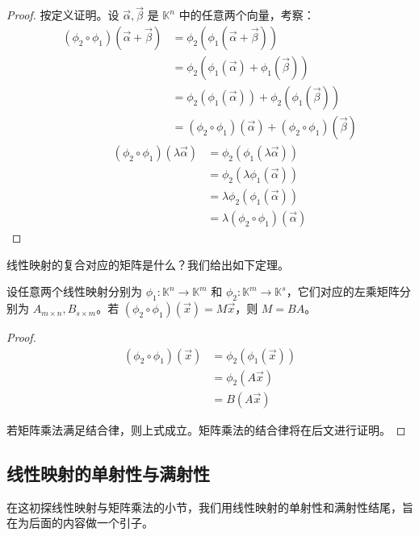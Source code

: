 \begin{proof}
	按定义证明。设 $\vec \alpha, \vec \beta$ 是 $\mathbb K^n$ 中的任意两个向量，考察：
	$$
	\begin{aligned}
		(\phi_2 \circ \phi_1) (\vec \alpha + \vec \beta) &= \phi_2(\phi_1(\vec \alpha + \vec \beta))
		\\&=
		\phi_2(\phi_1(\vec \alpha) + \phi_1(\vec \beta))
		\\&=
		\phi_2(\phi_1(\vec \alpha)) + \phi_2(\phi_1(\vec \beta))
		\\&=
		(\phi_2 \circ \phi_1)(\vec \alpha) + (\phi_2 \circ \phi_1)(\vec \beta)
	\end{aligned}
	$$$$
	\begin{aligned}
		(\phi_2 \circ \phi_1)(\lambda \vec \alpha) &= \phi_2(\phi_1(\lambda \vec \alpha))
		\\&=
		\phi_2(\lambda \phi_1(\vec \alpha))
		\\&=
		\lambda \phi_2(\phi_1(\vec \alpha))
		\\&=
		\lambda (\phi_2 \circ \phi_1)(\vec \alpha)
	\end{aligned}
	$$
\end{proof}

线性映射的复合对应的矩阵是什么？我们给出如下定理。

\begin{theorem}
	设任意两个线性映射分别为 $\phi_1 \colon \mathbb K^n \to \mathbb K^m$ 和 $\phi_2 \colon \mathbb K^m \to \mathbb K^s$，它们对应的左乘矩阵分别为 $A_{m \times n}, B_{s \times m}$。若 $(\phi_2 \circ \phi_1)(\vec x) = M \vec x$，则 $M = BA$。
\end{theorem}


\begin{proof}
	$$
	\begin{aligned}
		(\phi_2 \circ \phi_1)(\vec x) &= \phi_2(\phi_1(\vec x))
		\\&=
		\phi_2(A \vec x)
		\\&=
		B(A \vec x)
	\end{aligned}
	$$

	若矩阵乘法满足结合律，则上式成立。矩阵乘法的结合律将在后文进行证明。
\end{proof}

\subsection{线性映射的单射性与满射性}

在这初探线性映射与矩阵乘法的小节，我们用线性映射的单射性和满射性结尾，旨在为后面的内容做一个引子。

